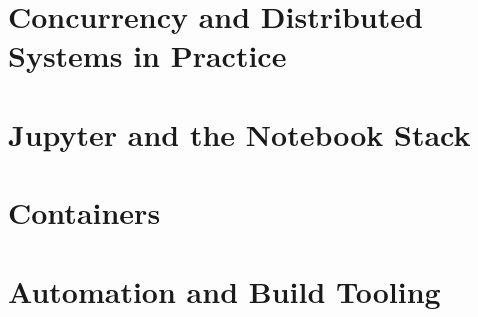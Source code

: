 \part{Concurrency and Distributed Systems in Practice}







\part{Jupyter and the Notebook Stack}







\part{Containers}







\part{Automation and Build Tooling}











